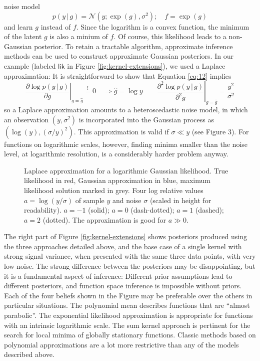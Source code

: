 \documentclass[twoside,11pt]{article}
\newcommand{\N}{\mathcal{N}}
\newcommand{\g}{\,|\,}
\newcommand{\de}{\partial}
\newcommand{\inputTikZ}[1]{%
 }
\newcommand{\inputTikZ}[1]{%
   \beginpgfgraphicnamed{#1-external}%
   \endpgfgraphicnamed%
 }
\begin{document}
\begin{description}
  noise model
  \begin{equation}
    \label{eq:12}
    p(y\g g) = \N(y; \exp(g), \sigma^2); \quad f = \exp(g)
  \end{equation}
  and learn $g$ instead of $f$. Since the logarithm is a convex
  function, the minimum of the latent $g$ is also a minium of $f$. Of
  course, this likelihood leads to a non-Gaussian posterior. To retain
  a tractable algorithm, approximate inference methods can be used to
  construct approximate Gaussian posteriors. In our example (labeled
  $\mathsf{lik}$ in Figure \ref{fig:kernel-extensions}), we used a
  Laplace approximation: It is straightforward to show that Equation
  \eqref{eq:12} implies
  \begin{equation}
    \label{eq:13}
    \left.\frac{\de \log p(y\g g)}{\de g}\right|_{g=\hat{g}}
  \operatorname*{=}^{!} 0 \quad \Rightarrow \hat{g}=\log y \qquad
\left.  \frac{\de^2 \log p(y\g g)}{\de^2 g}\right|_{g=\hat{g}} = \frac{y^2}{\sigma^2}
  \end{equation}
  so a Laplace approximation amounts to a heteroscedastic noise model,
  in which an observation $(y,\sigma^2)$ is incorporated into the
  Gaussian process as $(\log(y),(\sigma/y)^2)$. This approximation is
  valid if $\sigma \ll y$ (see Figure 3). For functions on logarithmic
  scales, however, finding minima smaller than the noise level, at
  logarithmic resolution, is a considerably harder problem anyway.
\end{description}

\begin{figure}%
\centering
\inputTikZ{figures/logarithms}
\caption{Laplace approximation for a logarithmic Gaussian
  likelihood. True likelihood in red, Gaussian approximation in blue,
  maximum likelihood solution marked in grey. Four log relative values
  $a=\log(y/\sigma)$ of sample $y$ and noise $\sigma$ (scaled in
  height for readability). $a=-1$ (solid); $a=0$ (dash-dotted); $a=1$
  (dashed); $a=2$ (dotted). The approximation is good for $a\gg0$.}%
\label{fig:log}%
\end{figure}

The right part of Figure \ref{fig:kernel-extensions} shows posteriors
produced using the three approaches detailed above, and the base case
of a single kernel with strong signal variance, when presented with
the same three data points, with very low noise.  The strong
difference between the posteriors may be disappointing, but it is a
fundamental aspect of inference: Different prior assumptions lead to
different posteriors, and function space inference is impossible
without priors. Each of the four beliefs shown in the Figure may be
preferable over the others in particular situations. The polynomial
mean describes functions that are “almost parabolic”. The exponential
likelihood approximation is appropriate for functions with an
intrinsic logarithmic scale. The sum kernel approach is pertinent for
the search for local minima of globally stationary functions. Classic
methods based on polynomial approximations are a lot more restrictive
than any of the models described above.
\end{document}
